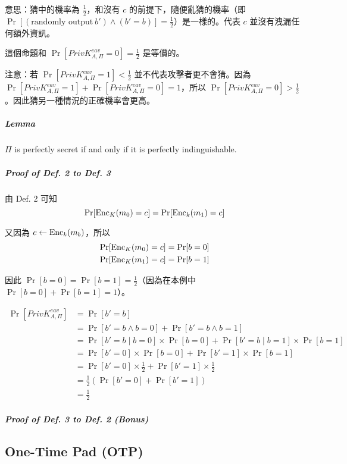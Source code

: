 意思：猜中的機率為 \(\frac{1}{2}\)，和沒有 \(c\) 的前提下，隨便亂猜的機率（即 \(\Pr[(\text{randomly output} \ b' ) \wedge (b' = b)] = \frac{1}{2}\)）是一樣的。代表 \(c\) 並沒有洩漏任何額外資訊。

這個命題和 \(\Pr[PrivK_{A, \Pi}^{eav} = 0] = \frac{1}{2}\) 是等價的。

注意：若 \(\Pr[PrivK_{A, \Pi}^{eav} = 1] < \frac{1}{2}\) 並不代表攻擊者更不會猜。因為 \(\Pr[PrivK_{A, \Pi}^{eav} = 1] + \Pr[PrivK_{A, \Pi}^{eav} = 0] = 1\)，所以 \(\Pr[PrivK_{A, \Pi}^{eav} = 0] > \frac{1}{2}\)。因此猜另一種情況的正確機率會更高。

\subparagraph{Lemma}

\(\Pi\) is perfectly secret if and only if it is perfectly indinguishable.

\subparagraph{Proof of Def. 2 to Def. 3}

由 Def. 2 可知
\[
	\Pr[\operatorname{Enc}_K(m_0) = c] = \Pr[\operatorname{Enc}_k(m_1) = c]
\]

又因為 \(c \leftarrow \operatorname{Enc}_k(m_b)\)，所以
\begin{align*}
	\Pr[\operatorname{Enc}_K(m_0) = c] = \Pr[b = 0] \\
	\Pr[\operatorname{Enc}_K(m_1) = c] = \Pr[b = 1]
\end{align*}

因此 \(\Pr[b = 0] = \Pr[b = 1] = \displaystyle\frac{1}{2}\)（因為在本例中 \(\Pr[b = 0] + \Pr[b = 1] = 1\)）。

\begin{align*}
	\Pr[PrivK_{A, \Pi}^{eav}] &= \Pr[b' = b] \\
	&= \Pr[b' = b \wedge b = 0] + \Pr[b' = b \wedge b = 1] \tag{rewrite} \\
	&= \Pr[b' = b \mid b = 0] \times \Pr[b = 0] + \Pr[b' = b \mid b = 1] \times \Pr[b = 1] \tag{rewrite} \\
	&= \Pr[b' = 0]  \times \Pr[b = 0] + \Pr[b' = 1] \times \Pr[b = 1] \\
	&= \Pr[b' = 0]  \times \frac{1}{2} + \Pr[b' = 1] \times \frac{1}{2} \tag{by Def. 2 denoted above} \\
	&= \frac{1}{2}(\Pr[b' = 0] + \Pr[b' = 1]) \\
	&= \frac{1}{2}	\tag{\(\because \Pr[b' = 0] + \Pr[b' = 1] = 1\)}
\end{align*}

\subparagraph{Proof of Def. 3 to Def. 2 (Bonus)}



\subsection{One-Time Pad (OTP)}

